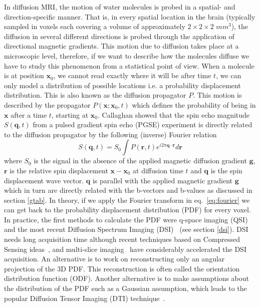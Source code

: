 \documentclass{bioinfo}
\begin{document}
In diffusion MRI, the motion of water molecules is probed in a spatial- and
direction-specific manner. That is, in every spatial location in the brain
(typically sampled in voxels each covering a volume of approximately
$2\times2\times2$ $mm^3$), the diffusion in several different directions is probed
through the application of directional magnetic gradients. This motion due to
diffusion takes
place at a microscopic level, therefore, if we want to describe how the
molecules diffuse we have to study this phenomenon from a statistical
point of view. When a molecule is at position $\mathbf{x}_{0}$, we cannot read
exactly where it will be after time $t$, we can only model a distribution of
possible locations i.e. a probability displacement distribution. This is also
known as the diffusion propagator $P$. This motion is described by the
propagator $P(\mathbf{x};\mathbf{x}_{0},t)$ which defines the probability of
being in $\mathbf{x}$ after a time $t$, starting at $\mathbf{x}_{0}$. Callaghan
\citep{callaghan:91} showed that the spin echo magnitude
$S(\mathbf{q},t)$ from a pulsed gradient spin echo (PGSE) experiment is
directly related to the diffusion propagator by the following (inverse) Fourier
relation
\begin{equation}
S(\mathbf{q},t)=S_{0}\int P(\mathbf{r},t)e^{i2\pi\mathbf{q}\cdot\mathbf{r}}d\mathbf{r}\label{eq:fourier}
\end{equation}
\noindent where $S_{0}$ is the signal in the absence of the applied magnetic
diffusion gradient $\mathbf{g}$, $\mathbf{r}$ is the relative spin displacement
$\mathbf{x}-\mathbf{x}_{0}$ at diffusion time $t$ and $\mathbf{q}$ is the spin
displacement wave vector. $\mathbf{q}$ is parallel with the applied magnetic
gradient $\mathbf{g}$ which in turn are directly related with the b-vectors
and b-values as discussed in section \ref{gtab}.  In theory, if we apply the Fourier
transform in eq.~\ref{eq:fourier} we can get back to the probability
displacement distribution (PDF) for every voxel.
In practice, the first methods to calculate the PDF were q-space imaging (QSI)~\citep{callaghan-eccles-etal:1988} and the most recent Diffusion Spectrum Imaging (DSI)~\citep{wedeen2005mapping} (see section \ref{dsi}).
DSI needs long acquisition time although recent techniques based on
Compressed Sensing
ideas~\citep{menzel-tan-etal:11,bilgic2012accelerated,gramfort-etal-media:13},
and multi-slice imaging~\citep{Setsompop2012569} have
considerably accelerated the DSI acquisition. An alternative is to
work on reconstructing only an angular projection of the 3D PDF. This
reconstruction is often called the orientation distribution function (ODF).
Another alternative is to make assumptions about the distribution of the PDF
such as a Gaussian assumption, which leads to the popular Diffusion Tensor
Imaging (DTI) technique~\citep{basser-mattiello-etal:94}.
\end{document}
